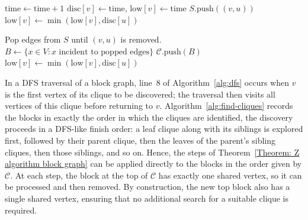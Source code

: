 \documentclass[11pt]{article}
\theoremstyle{plain}
\theoremstyle{definition}
\theoremstyle{remark}
\begin{document}
\begin{algorithm}[H]
\caption{DFS($v$, parent)}
\label{alg:dfs}
\begin{algorithmic}[1]
\State $\text{time} \gets \text{time} + 1$
\State $\text{disc}[v] \gets \text{time}$, $\text{low}[v] \gets \text{time}$
\State $S.\text{push} ((v,u))$
     
        \State {}
        \State $\text{low}[v] \gets \min(\text{low}[v], \text{disc}[u])$
        
            \State Pop edges from $S$ until $(v,u)$ is removed.
            \State $B \gets \{ x \in V : x \text{ incident to popped edges}\}$
            \State $\mathcal{C}.\text{push}(B)$
    \EndIf
     
        \State $\text{low}[v] \gets \min(\text{low}[v], \text{disc}[u])$
    \EndIf
\EndFor
\end{algorithmic}
\end{algorithm}

In a DFS traversal of a block graph, line~8 of Algorithm~\ref{alg:dfs} occurs when $v$ is the first vertex of its clique to be discovered; the traversal then visits all vertices of this clique before returning to $v$. Algorithm~\ref{alg:find-cliques} records the blocks in exactly the order in which the cliques are identified, the discovery proceeds in a DFS-like finish order: a leaf clique along with its siblings is explored first, followed by their parent clique, then the leaves of the parent’s sibling cliques, then those siblings, and so on. Hence, the steps of Theorem~\ref{Theorem: Z algorithm block graph} can be applied directly to the blocks in the order given by $\mathcal{C}$. At each step, the block at the top of $\mathcal{C}$ has exactly one shared vertex, so it can be processed and then removed. By construction, the new top block also has a single shared vertex, ensuring that no additional search for a suitable clique is required.
\end{document}
